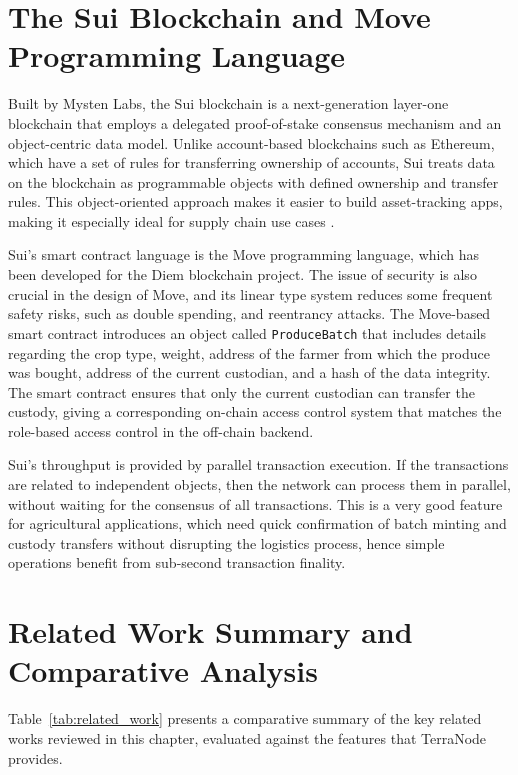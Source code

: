 \section{The Sui Blockchain and Move Programming Language}

Built by Mysten Labs, the Sui blockchain is a next-generation layer-one blockchain that employs a delegated proof-of-stake consensus mechanism and an object-centric data model. Unlike account-based blockchains such as Ethereum, which have a set of rules for transferring ownership of accounts, Sui treats data on the blockchain as programmable objects with defined ownership and transfer rules. This object-oriented approach makes it easier to build asset-tracking apps, making it especially ideal for supply chain use cases \parencite{sui2024documentation}.

Sui's smart contract language is the Move programming language, which has been developed for the Diem blockchain project. The issue of security is also crucial in the design of Move, and its linear type system reduces some frequent safety risks, such as double spending, and reentrancy attacks. The Move-based smart contract introduces an object called \texttt{ProduceBatch} that includes details regarding the crop type, weight, address of the farmer from which the produce was bought, address of the current custodian, and a hash of the data integrity. The smart contract ensures that only the current custodian can transfer the custody, giving a corresponding on-chain access control system that matches the role-based access control in the off-chain backend.

Sui's throughput is provided by parallel transaction execution. If the transactions are related to independent objects, then the network can process them in parallel, without waiting for the consensus of all transactions. This is a very good feature for agricultural applications, which need quick confirmation of batch minting and custody transfers without disrupting the logistics process, hence simple operations benefit from sub-second transaction finality.

\section{Related Work Summary and Comparative Analysis}

Table~\ref{tab:related_work} presents a comparative summary of the key related works reviewed in this chapter, evaluated against the features that TerraNode provides.

